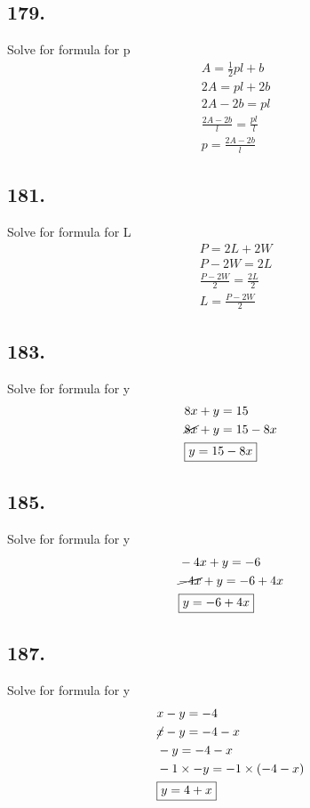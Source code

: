 \documentclass{article}
\begin{document}
    \subsection*{179.}
    Solve for formula for p
    \begin{align*}
        &  A = \frac{1}{2}pl + b\\
        &  2A = pl + 2b \\
        &  2A - 2b = pl \\
        & \frac{2A - 2b}{l} = \frac{pl}{l} \\
        & \boxed{p = \frac{2A - 2b}{l}}
    \end{align*}

    \subsection*{181.}
    Solve for formula for L
    \begin{align*}
        &  P = 2L+ 2W\\
        &  P - 2W = 2L \\
        & \frac{P - 2W}{2} = \frac{2L}{2} \\
        & \boxed{L = \frac{P - 2W}{2}}
    \end{align*}

    \subsection*{183.}
    Solve for formula for y
    \begin{align*}
        &  8x + y = 15\\
        &  \cancel{8x} + y = 15 - 8x \\
        & \boxed{y = 15 - 8x} \\
    \end{align*}

    \subsection*{185.}
    Solve for formula for y
    \begin{align*}
        &  -4x + y = -6\\
        &  \cancel{-4x} + y = -6 + 4x \\
        & \boxed{y = -6 + 4x} \\
    \end{align*}

    \subsection*{187.}
    Solve for formula for y
    \begin{align*}
        &  x - y = -4\\
        &  \cancel{x} - y = -4 - x \\
        & -y = -4 - x \\
        & -1 \times -y = -1 \times(-4 - x) \\
        & \boxed{y = 4 + x}
    \end{align*}
\end{document}
